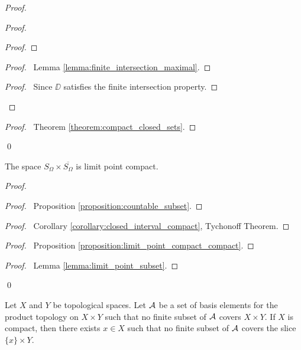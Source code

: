 \begin{proof}
\begin{proof}
\begin{proof}
        \end{proof}
        \begin{proof}
            \pf\ Lemma \ref{lemma:finite_intersection_maximal}.
        \end{proof}
        \begin{proof}
            \pf\ Since $\DD$ satisfies the finite intersection property.
        \end{proof}
    \end{proof}
    \qedstep
    \begin{proof}
        \pf\ Theorem \ref{theorem:compact_closed_sets}.
    \end{proof}
    \qed
\end{proof}

\begin{example}
    The space $S_\Omega \times \overline{S_\Omega}$ is limit point compact.

\begin{proof}
    \pf
    \begin{proof}
        \pf\ Proposition \ref{proposition:countable_subset}.
    \end{proof}
    \begin{proof}
        \pf\ Corollary \ref{corollary:closed_interval_compact}, Tychonoff Theorem.
    \end{proof}
    \begin{proof}
        \pf\ Proposition \ref{proposition:limit_point_compact_compact}.
    \end{proof}
    \begin{proof}
        \pf\ Lemma \ref{lemma:limit_point_subset}.
    \end{proof}
    \qed
\end{proof}

\end{example}

\begin{lemma}
    \label{lemma:preTychonoff}
    Let $X$ and $Y$ be topological spaces.
    Let $\AA$ be a set of basis elements for the product topology on $X \times Y$ such that no finite subset of $\AA$ covers $X \times Y$.
    If $X$ is compact, then there exists $x \in X$ such that no finite subset of $\AA$ covers the slice $\{x\} \times Y$.
\end{lemma}

